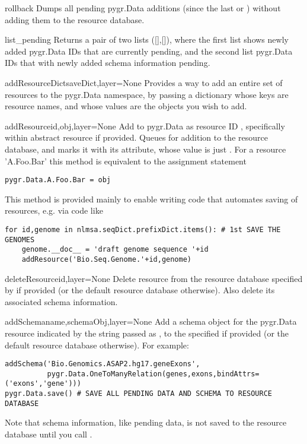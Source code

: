 \documentclass{howto}
\begin{document}
\begin{funcdesc}{rollback}{}
  Dumps all pending pygr.Data additions (since the last 
  or ) without adding them to the resource database.
\end{funcdesc}

\begin{funcdesc}{list_pending}{}
  Returns a pair of two lists ([],[]), where
  the first list shows newly added pygr.Data IDs that are currently pending,
  and the second list pygr.Data IDs that with newly added schema information
  pending.
\end{funcdesc}

\begin{funcdesc}{addResourceDict}{saveDict,layer=None}
  Provides a way to add an entire set of resources to the pygr.Data namespace,
  by passing a dictionary whose keys are resource names, and whose values are
  the objects you wish to add.  
\end{funcdesc}
\begin{funcdesc}{addResource}{id,obj,layer=None}
  Add  to pygr.Data as resource ID , specifically within
  abstract resource  if provided.  Queues  for addition to 
  the resource database, and marks it with its 
  attribute, whose value is just .  For a resource  'A.Foo.Bar'
  this method is equivalent to the assignment statement
\begin{verbatim}
pygr.Data.A.Foo.Bar = obj
\end{verbatim}
  This method is provided mainly to enable writing code that automates
  saving of resources, e.g. via code like
\begin{verbatim}
for id,genome in nlmsa.seqDict.prefixDict.items(): # 1st SAVE THE GENOMES
    genome.__doc__ = 'draft genome sequence '+id
    addResource('Bio.Seq.Genome.'+id,genome)
\end{verbatim}
\end{funcdesc}

\begin{funcdesc}{deleteResource}{id,layer=None}
  Delete resource  from the resource database specified by
   if provided (or the default resource database otherwise).
  Also delete its associated schema information.
\end{funcdesc}

\begin{funcdesc}{addSchema}{name,schemaObj,layer=None}
  Add a schema object for the pygr.Data resource indicated by the
  string passed as , to the specified  if provided
  (or the default resource database otherwise).  For example:
\begin{verbatim}
addSchema('Bio.Genomics.ASAP2.hg17.geneExons',
          pygr.Data.OneToManyRelation(genes,exons,bindAttrs=('exons','gene')))
pygr.Data.save() # SAVE ALL PENDING DATA AND SCHEMA TO RESOURCE DATABASE
\end{verbatim}
\end{funcdesc}
Note that schema information, like pending data, is not saved to 
the resource database until you call .
\end{document}
